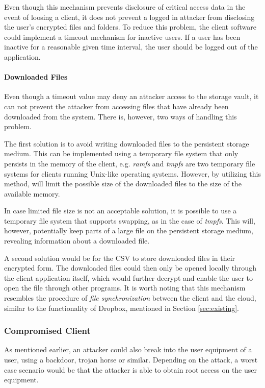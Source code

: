 \documentclass[pdftex,english,10pt,b5paper,twoside]{book}
\begin{document}
Even though this mechanism prevents disclosure of critical access data in the
event of loosing a client, it does not prevent a logged in attacker from
disclosing the user's encrypted files and folders. To reduce this problem, the
client software could implement a timeout mechanism for inactive users. If a
user has been inactive for a reasonable given time interval, the user should be
logged out of the application. 

\paragraph{Downloaded Files} Even though a timeout value may deny an attacker
access to the storage vault, it can not prevent the attacker from accessing
files that have already been downloaded from the system. There is, however, two
ways of handling this problem.

The first solution is to avoid writing downloaded files to the persistent
storage medium. This can be implemented using a temporary file system that only
persists in the memory of the client, e.g. \emph{ramfs} and \emph{tmpfs} are
two temporary file systems for clients running Unix-like operating systems.
However, by utilizing this method, will limit the possible size of the
downloaded files to the size of the available memory. 

In case limited file size is not an acceptable solution, it is possible to use
a temporary file system that supports swapping, as in the case of \emph{tmpfs}.
This will, however, potentially keep parts of a large file on the persistent
storage medium, revealing information about a downloaded file.

A second solution would be for the \acl{CSV} to store downloaded files in their
encrypted form. The downloaded files could then only be opened locally through
the client application itself, which would further decrypt and enable the user
to open the file through other programs. It is worth noting that this
mechanism resembles the procedure of \emph{file synchronization} between the
client and the cloud, similar to the functionality of Dropbox, mentioned in
Section \ref{sec:existing}.

\subsubsection{Compromised Client}

As mentioned earlier, an attacker could also break into the user equipment of a
user, using a backdoor, trojan horse or similar. Depending on the attack, a
worst case scenario would be that the attacker is able to obtain root access on
the user equipment. 
\end{document}
